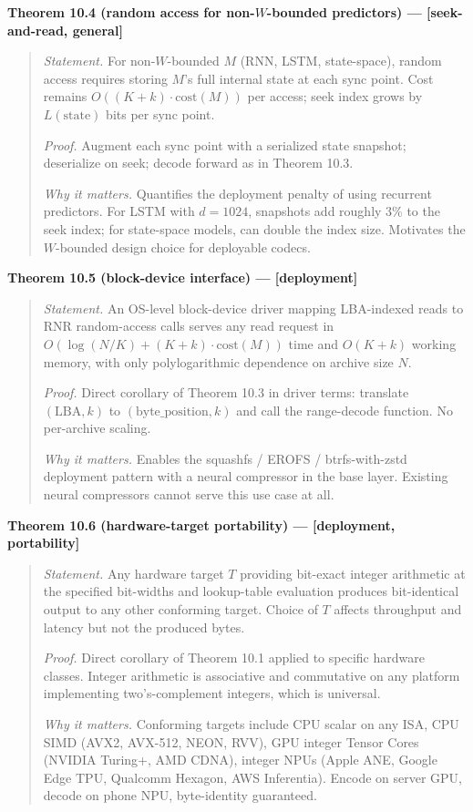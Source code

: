 \documentclass[
]{article}
\begin{document}
\textbf{Theorem 10.4 (random access for non-$W$-bounded predictors)
--- {[}seek-and-read, general{]}}

\begin{quote}
\emph{Statement.} For non-$W$-bounded $M$ (RNN, LSTM, state-space),
random access requires storing $M$'s full internal state at each
sync point. Cost remains $O((K + k) \cdot \mathrm{cost}(M))$ per
access; seek index grows by $L(\text{state})$ bits per sync point.

\emph{Proof.} Augment each sync point with a serialized state
snapshot; deserialize on seek; decode forward as in Theorem 10.3.

\emph{Why it matters.} Quantifies the deployment penalty of using
recurrent predictors. For LSTM with $d = 1024$, snapshots add
roughly 3\% to the seek index; for state-space models, can double
the index size. Motivates the $W$-bounded design choice for
deployable codecs.
\end{quote}

\textbf{Theorem 10.5 (block-device interface) --- {[}deployment{]}}

\begin{quote}
\emph{Statement.} An OS-level block-device driver mapping
LBA-indexed reads to RNR random-access calls serves any read request
in $O(\log(N/K) + (K + k) \cdot \mathrm{cost}(M))$ time and
$O(K + k)$ working memory, with only polylogarithmic dependence on
archive size $N$.

\emph{Proof.} Direct corollary of Theorem 10.3 in driver terms:
translate $(\mathrm{LBA}, k)$ to $(\text{byte\_position}, k)$ and
call the range-decode function. No per-archive scaling.

\emph{Why it matters.} Enables the squashfs / EROFS /
btrfs-with-zstd deployment pattern with a neural compressor in the
base layer. Existing neural compressors cannot serve this use case
at all.
\end{quote}

\textbf{Theorem 10.6 (hardware-target portability) ---
{[}deployment, portability{]}}

\begin{quote}
\emph{Statement.} Any hardware target $T$ providing bit-exact
integer arithmetic at the specified bit-widths and lookup-table
evaluation produces bit-identical output to any other conforming
target. Choice of $T$ affects throughput and latency but not the
produced bytes.

\emph{Proof.} Direct corollary of Theorem 10.1 applied to specific
hardware classes. Integer arithmetic is associative and commutative
on any platform implementing two's-complement integers, which is
universal.

\emph{Why it matters.} Conforming targets include CPU scalar on any
ISA, CPU SIMD (AVX2, AVX-512, NEON, RVV), GPU integer Tensor Cores
(NVIDIA Turing+, AMD CDNA), integer NPUs (Apple ANE, Google Edge
TPU, Qualcomm Hexagon, AWS Inferentia). Encode on server GPU, decode
on phone NPU, byte-identity guaranteed.
\end{quote}
\end{document}
